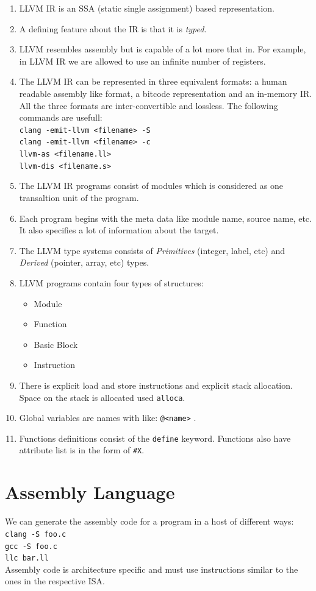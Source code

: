 \documentclass[12pt]{article}
\newcommand{\code}{\texttt}
\begin{document}
\begin{enumerate}
\item LLVM IR is an SSA (static single assignment) based representation.
\item A defining feature about the IR is that it is \textit{typed}.
\item LLVM resembles assembly but is capable of a lot more that in. For example, in LLVM IR we are allowed to use an infinite number of registers.
\item The LLVM IR can be represented in three equivalent formats: a human readable assembly like format, a bitcode representation and an in-memory IR. All the three formats are inter-convertible and lossless. The following commands are usefull:\\
\code{clang -emit-llvm <filename> -S}\\
\code{clang -emit-llvm <filename> -c}\\
\code{llvm-as <filename.ll>}\\
\code{llvm-dis <filename.s>}
\item The LLVM IR programs consist of modules which is considered as one transaltion unit of the program.
\item Each program begins with the meta data like module name, source name, etc. It also specifies a lot of information about the target.
\item The LLVM type systems consists of \textit{Primitives} (integer, label, etc) and \textit{Derived} (pointer, array, etc) types.
\item LLVM programs contain four types of structures:
\begin{itemize}
\item Module
\item Function
\item Basic Block
\item Instruction
\end{itemize}
\item There is explicit load and store instructions and explicit stack allocation. Space on the stack is allocated used \code{alloca}.
\item Global variables are names with like: \code{@<name>} .
\item Functions definitions consist of the \code{define} keyword. Functions also have attribute list is in the form of \code{\#X}.
\end{enumerate}
\section{Assembly Language}
We can generate the assembly code for a program in a host of different ways:\\
\code{clang -S foo.c}\\
\code{gcc -S foo.c}\\
\code{llc bar.ll}\\
Assembly code is architecture specific and must use instructions similar to the ones in the respective ISA.
\end{document}

